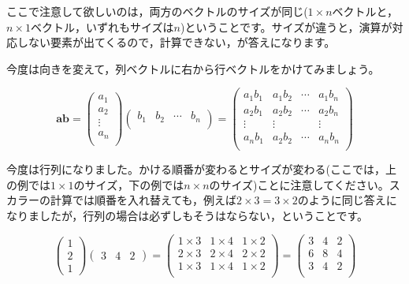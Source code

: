 \documentclass{ltjsbook}
\begin{document}
ここで注意して欲しいのは，両方のベクトルのサイズが同じ($1\times n$ベクトルと，$n \times 1$ベクトル，いずれもサイズは$n$)ということです。サイズが違うと，演算が対応しない要素が出てくるので，計算できない，が答えになります。

今度は向きを変えて，列ベクトルに右から行ベクトルをかけてみましょう。

\begin{equation*}
    \bm{a} \bm{b} =
    \begin{pmatrix}
    a_1\\
    a_2\\
    \vdots \\
    a_n\\
    \end{pmatrix}
    \begin{pmatrix}
    b_1 & b_2 & \cdots & b_n\\
    \end{pmatrix}
    =
    \begin{pmatrix}
    a_1 b_1 & a_1 b_2 & \cdots & a_1 b_n\\
    a_2 b_1 & a_2 b_2 & \cdots & a_2 b_n\\
    \vdots & \vdots & & \vdots \\
    a_n b_1 & a_2 b_2 & \cdots & a_n b_n\\
    \end{pmatrix}
\end{equation*}


今度は行列になりました。かける順番が変わるとサイズが変わる(ここでは，上の例では$1\times 1$のサイズ，下の例では$n \times n$のサイズ)ことに注意してください。スカラーの計算では順番を入れ替えても，例えば$2 \times 3=3\times 2$のように同じ答えになりましたが，行列の場合は必ずしもそうはならない，ということです。

\begin{equation*}
\begin{pmatrix}
1\\2\\1
\end{pmatrix}
\begin{pmatrix}
3 & 4 & 2
\end{pmatrix}
=
\begin{pmatrix}
1 \times 3 & 1 \times 4 & 1 \times 2 \\
2 \times 3 & 2 \times 4 & 2 \times 2 \\
1 \times 3 & 1 \times 4 & 1 \times 2 \\
\end{pmatrix}
=
\begin{pmatrix}
3 & 4 & 2\\
6 & 8 & 4 \\
3 & 4 & 2\\
\end{pmatrix}
\end{equation*}
\end{document}
